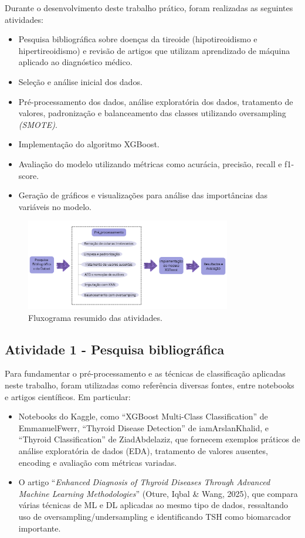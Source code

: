 \documentclass[11pt]{article}
\begin{document}
Durante o desenvolvimento deste trabalho prático, foram realizadas as seguintes atividades:

\begin{itemize}
    \item Pesquisa bibliográfica sobre doenças da tireoide (hipotireoidismo e hipertireoidismo) e revisão de artigos que utilizam aprendizado de máquina aplicado ao diagnóstico médico.
    \item Seleção e análise inicial dos dados.
    \item Pré-processamento dos dados, análise exploratória dos dados, tratamento de valores, padronização e balanceamento das classes utilizando oversampling \textit{(SMOTE)}.
    \item Implementação do algoritmo XGBoost.
    \item Avaliação do modelo utilizando métricas como acurácia, precisão, recall e f1-score.
    \item Geração de gráficos e visualizações para análise das importâncias das variáveis no modelo.
\end{itemize}

\begin{figure}[H]
    \centering
    \includegraphics[width=0.8\textwidth]{img/fluxogram.png}
    \caption{Fluxograma resumido das atividades.}
    \label{fig:fluxograma_atividades}
\end{figure}

\subsection{Atividade 1 - Pesquisa bibliográfica}

Para fundamentar o pré-processamento e as técnicas de classificação aplicadas neste trabalho, foram utilizadas como referência diversas fontes, entre notebooks e artigos científicos. Em particular:

\begin{itemize}
  \item Notebooks do Kaggle, como “XGBoost Multi-Class Classification” de EmmanuelFwerr, “Thyroid Disease Detection” de iamArslanKhalid, e “Thyroid Classification” de ZiadAbdelaziz, que fornecem exemplos práticos de análise exploratória de dados (EDA), tratamento de valores ausentes, encoding e avaliação com métricas variadas.
  \item O artigo “\textit{Enhanced Diagnosis of Thyroid Diseases Through Advanced Machine Learning Methodologies}” (Oture, Iqbal \& Wang, 2025), que compara várias técnicas de ML e DL aplicadas ao mesmo tipo de dados, ressaltando uso de oversampling/undersampling e identificando TSH como biomarcador importante. \cite{oture2025enhanced} 
\end{itemize}
\end{document}
